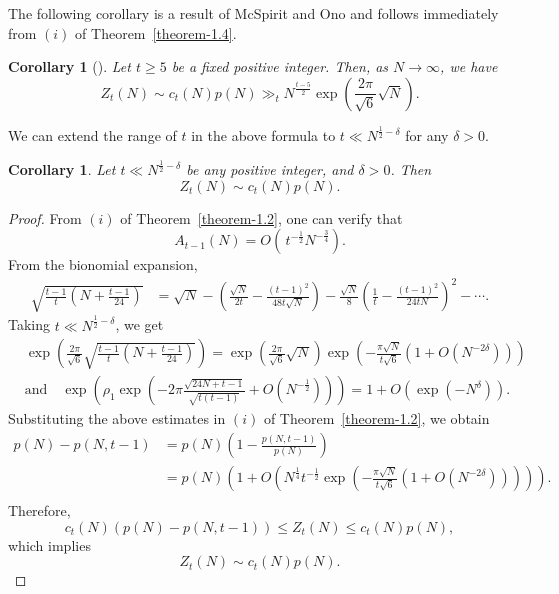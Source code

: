 \documentclass[11pt]{amsart}
\theoremstyle{plain}
\newtheorem{corollary}[theorem]{Corollary}
\numberwithin{equation}{section}
\begin{document}
	The following corollary is a result of McSpirit and Ono \cite{mcspirit2023zeros} and follows immediately  from \hyperlink{thm1.4i}{${(i)}$} of Theorem~\ref{theorem-1.4}.
	
	\begin{corollary}[{\cite[Theorem 1.1]{mcspirit2023zeros}}]
		Let $t \ge 5$ be a fixed positive integer. Then, as $N \to \infty$, we have
		\begin{equation*}
			Z_{t}(N)\sim c_{t}(N)p(N)\gg_{t}N^{\frac{t-5}{2}} \exp\left(\frac{2\pi}{\sqrt{6}} \sqrt{N}\right).
		\end{equation*}
	\end{corollary}
	We can extend the range of $t$ in the above formula to
	$t \ll N^{\frac{1}{2}-\delta}$ for any $\delta>0$.
	
	\begin{corollary}
		Let $t\ll N^{\frac{1}{2}-\delta}$ be any positive integer, and $\delta>0$. Then
		\begin{equation*}
			Z_{t}(N)\sim c_{t}(N)p(N).   
		\end{equation*}
	\end{corollary}
	\begin{proof}
		From \hyperlink{thm1.2i}{$(i)$} of Theorem~\ref{theorem-1.2}, one can verify that  
		\begin{equation*}
			A_{t-1}(N)= O\left(\, t^{-\frac{1}{2}} N^{-\tfrac{3}{4}}\right).
		\end{equation*}
		From the bionomial expansion,
		\begin{align*}
			\sqrt{\frac{t-1}{t}\left(N+\frac{t-1}{24}\right)} &= \sqrt{N}-\left(\frac{\sqrt{N}}{2t}-\frac{(t-1)^{2}}{48t\sqrt{N}}\right)-\frac{\sqrt{N}}{8}\left(\frac{1}{t}-\frac{(t-1)^{2}}{24tN}\right)^{2}-\cdots .
		\end{align*}
		Taking $t \ll N^{\frac{1}{2}-\delta}$, we get
		\begin{align*}
			&\exp\left(\frac{2\pi}{\sqrt{6}}\sqrt{\frac{t-1}{t}\left(N+\frac{t-1}{24}\right)}\right)= \exp\left(\frac{2\pi}{\sqrt{6}}\sqrt{N}\right)\exp\left(-\frac{\pi\sqrt{N}}{t\sqrt{6}}\left(1+O\left(N^{-2\delta}\right)\right)\right)\\
			&\text{and}\quad \exp\left(\rho_1\exp\left(-2\pi\frac{\sqrt{24N+t-1}}{\sqrt{t(t-1)}}+O\left(N^{-\frac{1}{2}}\right)\right)\right)=1+O\left(\exp\left(-N^{\delta}\right)\right).
		\end{align*}
		Substituting the above estimates in \hyperlink{thm1.2i}{$(i)$} of Theorem~\ref{theorem-1.2}, we obtain 
		\begin{align*}
			p(N)-p(N,t-1)&=p(N)\left(1-\frac{p(N,t-1)}{p(N)}\right)\\
			&=p(N)\left(1+O\left(N^{\frac{1}{4}}t^{-\frac{1}{2}}\exp\left(-\frac{\pi\sqrt{N}}{t\sqrt{6}}\left(1+O\left(N^{-2\delta}\right)\right)\right)\right)\right).\\
		\end{align*}
		Therefore,
		\begin{equation*}
			c_{t}(N)\left(p(N)-p(N,t-1)\right)\le Z_{t}(N)\le c_{t}(N)p(N),
		\end{equation*}
		which implies 
		\begin{equation*}
			Z_{t}(N)\sim c_{t}(N)p(N).   
		\end{equation*}    
	\end{proof}
\end{document}
